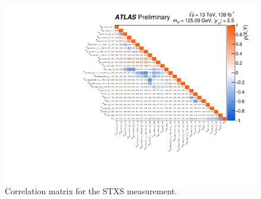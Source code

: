 \begin{figure}[!tpb]
\centering
\includegraphics[width=.995\textwidth]{figures/couplings_chapter/corrmat_STXS_obs.pdf}
\caption{Correlation matrix for the STXS measurement.
}
\label{fig:results:STXS_corr}
\end{figure}



